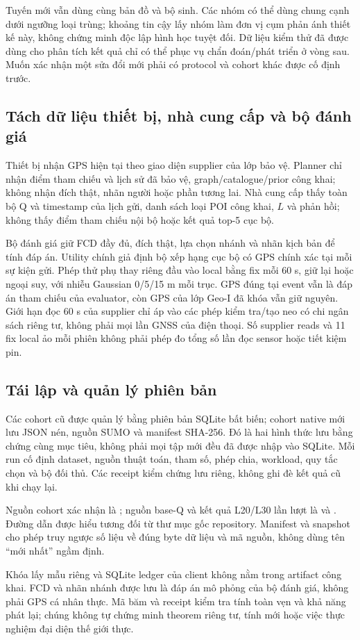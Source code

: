 Tuyến mới vẫn dùng cùng bản đồ và bộ sinh. Các nhóm có thể dùng chung cạnh dưới ngưỡng loại trùng; khoảng tin cậy lấy nhóm làm đơn vị cụm phản ánh thiết kế này, không chứng minh độc lập hình học tuyệt đối. Dữ liệu kiểm thử đã được dùng cho phân tích kết quả chỉ có thể phục vụ chẩn đoán/phát triển ở vòng sau. Muốn xác nhận một sửa đổi mới phải có protocol và cohort khác được cố định trước.

\subsection{Tách dữ liệu thiết bị, nhà cung cấp và bộ đánh giá}

Thiết bị nhận GPS hiện tại theo giao diện supplier của lớp bảo vệ. Planner chỉ nhận điểm tham chiếu và lịch sử đã bảo vệ, graph/catalogue/prior công khai; không nhận đích thật, nhãn người hoặc phần tương lai. Nhà cung cấp thấy toàn bộ Q và timestamp của lịch gửi, danh sách loại POI công khai, $L$ và phản hồi; không thấy điểm tham chiếu nội bộ hoặc kết quả top-5 cục bộ.

Bộ đánh giá giữ FCD đầy đủ, đích thật, lựa chọn nhánh và nhãn kịch bản để tính đáp án. Utility chính giả định bộ xếp hạng cục bộ có GPS chính xác tại mỗi sự kiện gửi. Phép thử phụ thay riêng đầu vào local bằng fix mỗi 60 s, giữ lại hoặc ngoại suy, với nhiễu Gaussian 0/5/15 m mỗi trục. GPS đúng tại event vẫn là đáp án tham chiếu của evaluator, còn GPS của lớp Geo-I đã khóa vẫn giữ nguyên. Giới hạn đọc 60 s của supplier chỉ áp vào các phép kiểm tra/tạo neo có chi ngân sách riêng tư, không phải mọi lần GNSS của điện thoại. Số supplier reads và 11 fix local ảo mỗi phiên không phải phép đo tổng số lần đọc sensor hoặc tiết kiệm pin.

\subsection{Tái lập và quản lý phiên bản}

Các cohort cũ được quản lý bằng phiên bản SQLite bất biến; cohort native mới lưu JSON nén, nguồn SUMO và manifest SHA-256. Đó là hai hình thức lưu bằng chứng cùng mục tiêu, không phải mọi tập mới đều đã được nhập vào SQLite. Mỗi run cố định dataset, nguồn thuật toán, tham số, phép chia, workload, quy tắc chọn và bộ đối thủ. Các receipt kiểm chứng lưu riêng, không ghi đè kết quả cũ khi chạy lại.

Nguồn cohort xác nhận là ; nguồn base-Q và kết quả L20/L30 lần lượt là  và . Đường dẫn được hiểu tương đối từ thư mục gốc repository. Manifest và snapshot cho phép truy ngược số liệu về đúng byte dữ liệu và mã nguồn, không dùng tên ``mới nhất'' ngầm định.

Khóa lấy mẫu riêng và SQLite ledger của client không nằm trong artifact công khai. FCD và nhãn nhánh được lưu là đáp án mô phỏng của bộ đánh giá, không phải GPS cá nhân thực. Mã băm và receipt kiểm tra tính toàn vẹn và khả năng phát lại; chúng không tự chứng minh theorem riêng tư, tính mới hoặc việc thực nghiệm đại diện thế giới thực.
